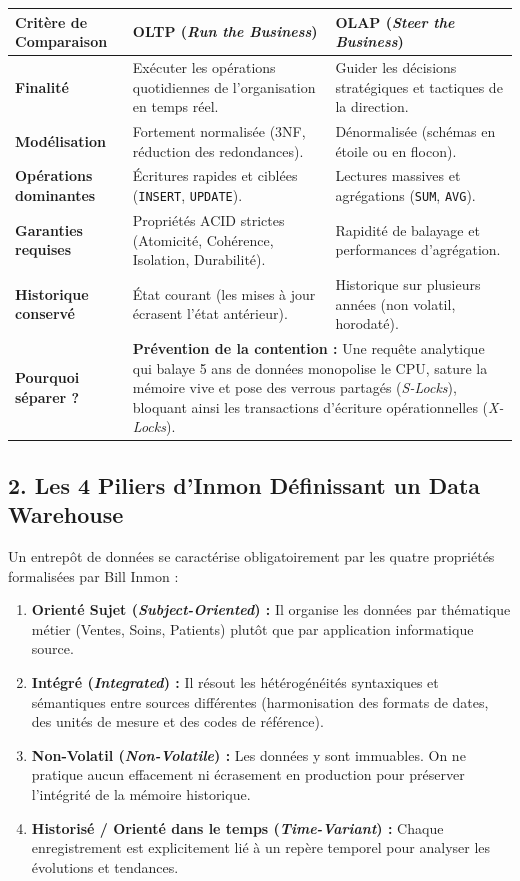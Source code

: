 \documentclass[11pt, a4paper]{article}
\begin{document}
\begin{center}
\renewcommand{\arraystretch}{1.25}
\begin{tabularx}{\textwidth}{p{3.5cm} X X}
\toprule
\textbf{Critère de Comparaison} & \textbf{OLTP (\textit{Run the Business})} & \textbf{OLAP (\textit{Steer the Business})} \\
\midrule
\textbf{Finalité} & Exécuter les opérations quotidiennes de l'organisation en temps réel. & Guider les décisions stratégiques et tactiques de la direction. \\
\textbf{Modélisation} & Fortement normalisée (3NF, réduction des redondances). & Dénormalisée (schémas en étoile ou en flocon). \\
\textbf{Opérations dominantes} & Écritures rapides et ciblées (\texttt{INSERT}, \texttt{UPDATE}). & Lectures massives et agrégations (\texttt{SUM}, \texttt{AVG}). \\
\textbf{Garanties requises} & Propriétés ACID strictes (Atomicité, Cohérence, Isolation, Durabilité). & Rapidité de balayage et performances d'agrégation. \\
\textbf{Historique conservé} & État courant (les mises à jour écrasent l'état antérieur). & Historique sur plusieurs années (non volatil, horodaté). \\
\textbf{Pourquoi séparer ?} & \multicolumn{2}{p{12cm}}{\textbf{Prévention de la contention :} Une requête analytique qui balaye 5 ans de données monopolise le CPU, sature la mémoire vive et pose des verrous partagés (\textit{S-Locks}), bloquant ainsi les transactions d'écriture opérationnelles (\textit{X-Locks}).} \\
\bottomrule
\end{tabularx}
\end{center}

\subsection{2. Les 4 Piliers d'Inmon Définissant un Data Warehouse}
Un entrepôt de données se caractérise obligatoirement par les quatre propriétés formalisées par Bill Inmon :
\begin{enumerate}
    \item \textbf{Orienté Sujet (\textit{Subject-Oriented}) :} Il organise les données par thématique métier (Ventes, Soins, Patients) plutôt que par application informatique source.
    \item \textbf{Intégré (\textit{Integrated}) :} Il résout les hétérogénéités syntaxiques et sémantiques entre sources différentes (harmonisation des formats de dates, des unités de mesure et des codes de référence).
    \item \textbf{Non-Volatil (\textit{Non-Volatile}) :} Les données y sont immuables. On ne pratique aucun effacement ni écrasement en production pour préserver l'intégrité de la mémoire historique.
    \item \textbf{Historisé / Orienté dans le temps (\textit{Time-Variant}) :} Chaque enregistrement est explicitement lié à un repère temporel pour analyser les évolutions et tendances.
\end{enumerate}
\end{document}
